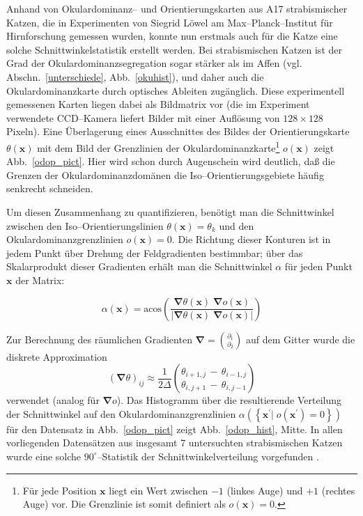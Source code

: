 Anhand von Okulardominanz-- und Orientierungskarten aus A17 strabismischer
Katzen, die in Experimenten von Siegrid Löwel am Max--Planck--Institut
für Hirnforschung gemessen wurden, konnte nun erstmals auch für die Katze
eine solche Schnittwinkelstatistik erstellt werden. Bei strabismischen
Katzen ist der Grad der Okulardominanzsegregation sogar stärker als im
Affen (vgl. Abschn.~\ref{unterschiede}, Abb.~\ref{okuhist}), und daher auch
die Okulardominanzkarte durch optisches Ableiten zugänglich. Diese
experimentell gemessenen Karten liegen dabei als Bildmatrix vor (die im
Experiment verwendete CCD--Kamera liefert Bilder mit einer Auflösung von
$128\times 128$ Pixeln). Eine Überlagerung eines Ausschnittes des Bildes
der Orientierungskarte $\theta(\mathbf{x})$ mit dem Bild der Grenzlinien
der Okulardominanzkarte\footnote{Für jede Position $\mathbf{x}$ liegt ein
Wert zwischen $-1$ (linkes Auge) und $+1$ (rechtes Auge) vor. Die
Grenzlinie ist somit definiert als $o(\mathbf{x}) = 0$.} $o(\mathbf{x})$
zeigt Abb.~\ref{odop_pict}. Hier wird schon durch Augenschein wird
deutlich, daß die Grenzen der Okulardominanzdomänen die
Iso--Orientierungsgebiete häufig senkrecht schneiden.
\setcounter{footnote}{1}

Um diesen Zusammenhang zu quantifizieren, benötigt man die Schnittwinkel
zwischen den Iso--Orientierungslinien $\theta(\mathbf{x})=\theta_k$ und den
Okulardominanzgrenzlinien $o(\mathbf{x}) = 0$.  Die Richtung dieser
Konturen ist in jedem Punkt über Drehung der Feldgradienten bestimmbar;
über das Skalarprodukt dieser Gradienten erhält man die Schnittwinkel
$\alpha$ für jeden Punkt $\mathbf{x}$ der Matrix:

\begin{equation*}
\alpha(\mathbf{x})=\text{acos}\!\left(\frac{\pmb\nabla\theta(\mathbf{x})
\;\pmb\nabla o(\mathbf{x})}{\vert\pmb\nabla\theta(\mathbf{x})\;\pmb\nabla
o(\mathbf{x})\vert}\right)
\end{equation*}

Zur Berechnung des räumlichen Gradienten $\pmb\nabla =
{\binom{\partial_1}{\partial_2}}$ auf dem Gitter wurde die diskrete
Approximation
\begin{equation*}
(\pmb\nabla\theta)_{ij}\approx\frac{1}{2\Delta}{\binom{\theta_{i+1,j}\,-\,\theta_{i-1,j}}{\theta_{i,j+1}\,-\,\theta_{i,j-1}}}
\end{equation*}
verwendet (analog für $\pmb\nabla o$). Das Histogramm über die
resultierende Verteilung der Schnittwinkel auf den
Okulardominanzgrenzlinien $\alpha(\left\{\mathbf{x}^\prime\vert\;
o(\mathbf{x}^\prime)=0\right\})$ für den Datensatz in Abb.~\ref{odop_pict}
zeigt Abb.~\ref{odop_hist}, Mitte. In allen vorliegenden Datensätzen aus
insgesamt 7 untersuchten strabismischen Katzen wurde eine solche
$90^\circ$--Statistik der Schnittwinkelverteilung vorgefunden
.

